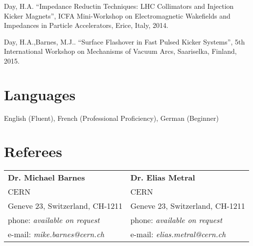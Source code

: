 \documentclass[margin,line]{resume}
\begin{document}
\begin{resume}
	Day, H.A.
    ``Impedance Reductin Techniques: LHC Collimators and Injection Kicker Magnets'',
    ICFA Mini-Workshop on Electromagnetic Wakefields and Impedances in Particle Accelerators, Erice, Italy, 2014.

	Day, H.A.,Barnes, M.J..
    ``Surface Flashover in Fast Pulsed Kicker Systems'',
    5th International Workshop on Mechanisms of Vacuum Arcs, Saariselka, Finland, 2015.


    \section{\mysidestyle Languages} 

   English (Fluent), French (Professional Proficiency), German (Beginner)






\section{\mysidestyle Referees} 

\begin{tabular}{@{}p{6cm}p{6cm}}
\textbf{Dr. Michael Barnes}  &   \textbf{Dr. Elias Metral}                       \\
CERN                     &  CERN                      \\
Geneve 23, Switzerland, CH-1211           &  Geneve 23, Switzerland, CH-1211        \\
phone: \textsl{available on request}    &  phone: \textsl{available on request}     \\
e-mail: \textsl{mike.barnes@cern.ch}   &  e-mail: \textsl{elias.metral@cern.ch}    \\
\end{tabular}


\end{resume}
\end{document}
